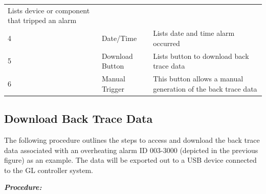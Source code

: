 \begin{longtable}[]{@{}lll@{}}
\begin{minipage}[t]{0.61\columnwidth}
Lists device or component that tripped an alarm\strut
\end{minipage}\tabularnewline
\begin{minipage}[t]{0.09\columnwidth}\raggedright
4\strut
\end{minipage} & \begin{minipage}[t]{0.20\columnwidth}\raggedright
Date/Time\strut
\end{minipage} & \begin{minipage}[t]{0.61\columnwidth}\raggedright
Lists date and time alarm occurred\strut
\end{minipage}\tabularnewline
\begin{minipage}[t]{0.09\columnwidth}\raggedright
5\strut
\end{minipage} & \begin{minipage}[t]{0.20\columnwidth}\raggedright
Download Button\strut
\end{minipage} & \begin{minipage}[t]{0.61\columnwidth}\raggedright
Lists button to download back trace data\strut
\end{minipage}\tabularnewline
\begin{minipage}[t]{0.09\columnwidth}\raggedright
6\strut
\end{minipage} & \begin{minipage}[t]{0.20\columnwidth}\raggedright
Manual Trigger\strut
\end{minipage} & \begin{minipage}[t]{0.61\columnwidth}\raggedright
This button allows a manual generation of the back trace data\strut
\end{minipage}\tabularnewline
\bottomrule
\end{longtable}


\subsection{Download Back Trace
Data}

The following procedure outlines the steps to access and download the
back trace data associated with an overheating alarm ID 003-3000
(depicted in the previous figure) as an example. The data will be
exported out to a USB device connected to the GL controller system.

\textbf{\emph{Procedure:}}


